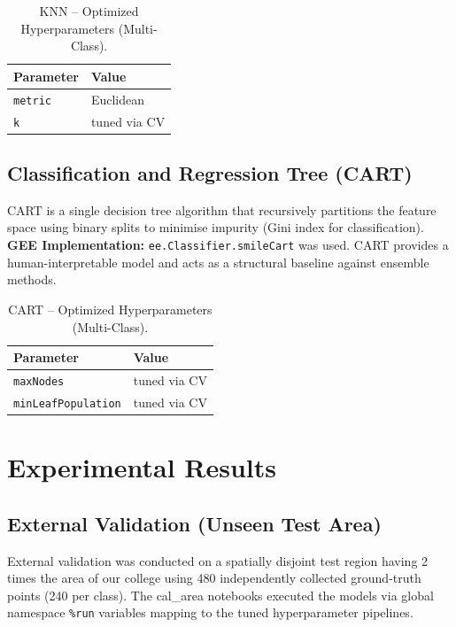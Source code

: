\documentclass[12pt, a4paper, twocolumn]{article}
\begin{document}
\begin{table}[H]
\centering
\caption{KNN -- Optimized Hyperparameters (Multi-Class).}
\label{tab:knn_params}
\begin{tabular}{@{}ll@{}}
\toprule
\textbf{Parameter} & \textbf{Value} \\
\midrule
\texttt{metric} & Euclidean \\
\texttt{k} & tuned via CV \\
\bottomrule
\end{tabular}
\end{table}

\subsection{Classification and Regression Tree (CART)}
\label{subsec:cart}

CART is a single decision tree algorithm that recursively partitions the feature space using binary splits to minimise impurity (Gini index for classification).
\textbf{GEE Implementation:} \texttt{ee.Classifier.smileCart} was used. CART provides a human-interpretable model and acts as a structural baseline against ensemble methods.

\begin{table}[H]
\centering
\caption{CART -- Optimized Hyperparameters (Multi-Class).}
\label{tab:cart_params}
\begin{tabular}{@{}ll@{}}
\toprule
\textbf{Parameter} & \textbf{Value} \\
\midrule
\texttt{maxNodes} & tuned via CV \\
\texttt{minLeafPopulation} & tuned via CV \\
\bottomrule
\end{tabular}
\end{table}

\section{Experimental Results}
\label{sec:results}

\subsection{External Validation (Unseen Test Area)}

External validation was conducted on a spatially disjoint test region having 2 times the area of our college using 480 independently collected ground-truth points (240 per class).
The cal\_area notebooks executed the models via global namespace \texttt{\%run} variables mapping to the tuned hyperparameter pipelines.
\end{document}
